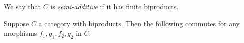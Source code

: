 \noindent We say that $C$ is \emph{semi-additive} if it has finite biproducts.

\begin{proposition}
\label{prop:biproduct:prod-coprod}
Suppose $C$ a category with biproducts. Then the following commutes for any morphisms $f_1, g_1, f_2,
g_2$ in $C$:

\begin{center}
\end{center}
\end{proposition}

